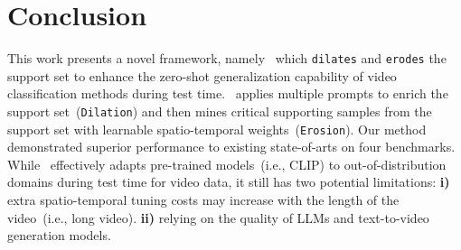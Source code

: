 \section{Conclusion}
\label{conclusion}
{This work presents a novel framework, namely \testv~which \texttt{dilates} and \texttt{erodes} the support set to enhance the zero-shot generalization capability of video classification methods during test time. \testv~applies multiple prompts to enrich the support set~(\texttt{Dilation}) and then mines critical supporting samples from the support set with learnable spatio-temporal weights~(\texttt{Erosion}). Our method demonstrated superior performance to existing state-of-arts on four benchmarks. While \testv~effectively adapts pre-trained models~(i.e., CLIP) to out-of-distribution domains during test time for video data, it still has two potential limitations: \textbf{i)} extra spatio-temporal tuning costs may increase with the length of the video~(i.e., long video). \textbf{ii)} relying on the quality of LLMs and text-to-video generation models.




}